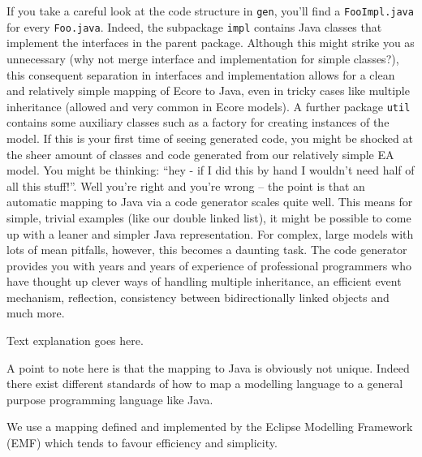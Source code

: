 \begin{enumerate}
If you take a careful look at the code structure in \texttt{gen}, you'll find a \texttt{Foo\-Impl.java} for every \texttt{Foo.java}. 
Indeed, the subpackage \texttt{impl} contains Java classes that implement the interfaces in the parent package.  
Although this might strike you as unnecessary (why not merge interface and implementation for simple classes?), this consequent separation in interfaces and implementation allows for a clean and relatively simple mapping of Ecore to Java, even in tricky cases like multiple inheritance (allowed and very common in Ecore models).  
A further package \texttt{util} contains some auxiliary classes such as a factory for creating instances of the model.  
If this is your first time of seeing generated code, you might be shocked at the sheer amount of classes and code generated from our relatively simple EA model.  
You might be thinking: ``hey - if I did this by hand I wouldn't need half of all this stuff!''.  
Well you're right and you're wrong -- the point is that an automatic mapping to Java via a code generator scales quite well.
This means for simple, trivial examples (like our double linked list), it might be possible to come up with a leaner and simpler Java representation.  
For complex, large models with lots of mean pitfalls, however, this becomes a daunting task.  
The code generator provides you with years and years of experience of professional programmers who have thought up clever ways of handling multiple inheritance, an efficient event mechanism, reflection, consistency between bidirectionally linked objects and much more.

\newpage
\texHeader
Text explanation goes here.
\pagebreak

\visHeader

A point to note here is that the mapping to Java is obviously not unique. 
Indeed there exist different standards of how to map a modelling language to a general purpose programming language like Java. 

We use a mapping defined and implemented by the Eclipse Modelling Framework (EMF) which tends to favour efficiency and simplicity.


\end{enumerate}
